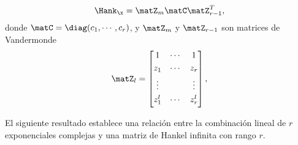 	\begin{equation}
		\Hank_{\x} = \matZ_m\matC\matZ_{r-1}^T,
		\label{Hdecomposition:eq}
	\end{equation}
	donde  $\matC =\diag(c_1,\cdots,c_r)$, y $\matZ_m$ y $\matZ_{r-1}$ son matrices de Vandermonde 
	\begin{equation}
		\matZ_l = \begin{bmatrix} 1 & \cdots & 1 \\[0.3em] 
		z_1  & \cdots & z_r \\[0.3em] 
		\vdots  &        & \vdots \\[0.3em]
		z_1^{l} & \cdots & z_r^{l} \\[0.3em]
		\end{bmatrix},
		\label{Eq:VandermondeMatrix}
	\end{equation}

	El siguiente resultado establece una relación entre la combinación lineal de $r$ exponenciales complejas y una matriz de Hankel infinita con rango $r$.

